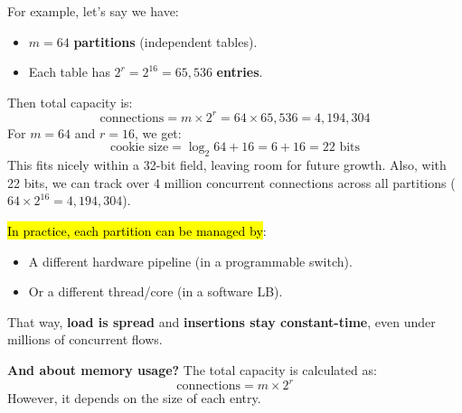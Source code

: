 \begin{examplebox}
    For example, let's say we have:
    \begin{itemize}
        \item $m=64$ \textbf{partitions} (independent tables).
        \item Each table has $2^r = 2^{16} = 65,536$ \textbf{entries}.
    \end{itemize}
    Then total capacity is:
    \begin{equation*}
        \text{connections} = m \times 2^r = 64 \times 65,536 = 4,194,304
    \end{equation*}
    For $m=64$ and $r=16$, we get:
    \begin{equation*}
        \text{cookie size} = \log_{2} 64 + 16 = 6 + 16 = 22 \text{ bits}
    \end{equation*}
    This fits nicely within a 32-bit field, leaving room for future growth. Also, with 22 bits, we can track over 4 million concurrent connections across all partitions ($64 \times 2^{16} = 4,194,304$).
\end{examplebox}

\noindent
\hl{In practice, each partition can be managed by}:
\begin{itemize}
    \item A different hardware pipeline (in a programmable switch).
    \item Or a different thread/core (in a software LB).
\end{itemize}
That way, \textbf{load is spread} and \textbf{insertions stay constant-time}, even under millions of concurrent flows.

\highspace
\textcolor{Green3}{ \textbf{And about memory usage?}} The total capacity is calculated as:
\begin{equation}
    \text{connections} = m \times 2^r
\end{equation}
However, it depends on the size of each  entry.

